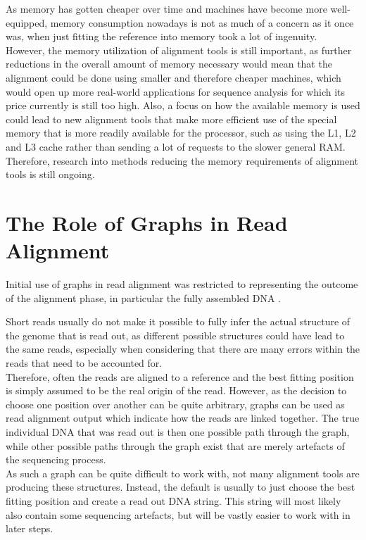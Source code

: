 \documentclass[a4paper,12pt,twoside,BCOR=10mm]{scrbook}
\begin{document}
As memory has gotten cheaper over time and machines have become more
well-equipped, memory consumption nowadays is not as much of a concern
as it once was, when just fitting the reference into memory
took a lot of ingenuity. \\
However, the memory utilization of alignment tools is still important,
as further reductions in the overall amount of memory necessary would
mean that the alignment could be done using smaller and therefore cheaper
machines, which would open up more real-world applications for sequence analysis
for which its price currently is still too high.
Also, a focus on how the available memory is used could lead to new alignment
tools that make more efficient use of the special memory that is more readily available
for the processor, such as using the L1, L2 and L3 cache rather than sending a lot of
requests to the slower general RAM. \\
Therefore, research into methods reducing the memory requirements of alignment tools
is still ongoing.

\section{The Role of Graphs in Read Alignment}

Initial use of graphs in read alignment was restricted to representing
the outcome of the alignment phase, in particular the fully assembled DNA \citep{Myers2005}.

Short reads usually do not make it possible to fully infer the actual structure of the genome that is read out,
as different possible structures could have lead to the same reads, especially when considering that
there are many errors within the reads that need to be accounted for. \\
Therefore, often the reads are aligned to a reference and the best fitting position is simply
assumed to be the real origin of the read. However, as the decision to choose one position over
another can be quite arbitrary, graphs can be used as read alignment output which indicate how the reads
are linked together. The true individual DNA that was read out is then one possible path through the graph,
while other possible paths through the graph exist that are merely artefacts of the sequencing process. \\
As such a graph can be quite difficult to work with, not many alignment tools are producing these
structures. Instead, the default is usually to just choose the best fitting position and
create a read out DNA string. This string will most likely also contain some sequencing artefacts,
but will be vastly easier to work with in later steps.
\end{document}

